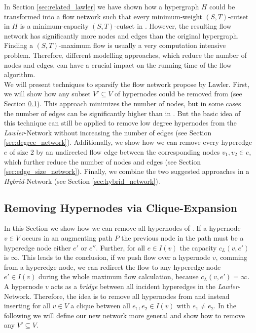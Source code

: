
In Section \ref{sec:related_lawler} we have shown how a hypergraph $H$ could be transformed into 
a flow network  such that every minimum-weight $(S,T)$-cutset in $H$ is a
minimum-capacity $(S,T)$-cutset in  \cite{lawler1973}. However, the resulting flow
network has significantly more nodes and edges than the original hypergraph. Finding a
$(S,T)$-maximum flow is usually a very computation intensive problem. 
Therefore, different modelling approaches, which reduce the number of nodes and edges,
can have a crucial impact on the running time of the flow algorithm. \\
We will present techniques to sparsify the flow network 
propose by Lawler. First, we will show how any subset $V' \subseteq V$ of hypernodes could be removed 
from  (see Section \ref{sec:heuer_network}). This approach minimizes
the number of nodes, but in some cases the number of edges can be
significantly higher than in . But the basic idea of this technique 
can still be applied to remove low degree hypernodes from the \emph{Lawler}-Network without 
increasing the number of edges (see Section \ref{sec:degree_network}). Additionally, we show
how we can remove every hyperedge $e$ of size $2$ by an undirected flow edge between
the corresponding nodes $v_1,v_2 \in e$, which further reduce the
number of nodes and edges (see Section \ref{sec:edge_size_network}). Finally, we combine
the two suggested approaches in a \emph{Hybrid}-Network (see Section \ref{sec:hybrid_network}).



\subsection{Removing Hypernodes via Clique-Expansion}
\label{sec:heuer_network}

In this Section we show how we can remove all hypernodes of . If a hypernode $v \in V$
occurs in an augmenting path $P$ the previous node in the path must be a hyperedge node either
$e'$ or $e''$. Further, for all $e \in I(v)$ the capacity $c_L(v,e')$ is $\infty$. This leads to
the conclusion, if we push flow over a hypernode $v$, comming from a hyperedge node, we can redirect
the flow to any hyperedge node $e' \in I(v)$ during the whole maximum flow calculation, because 
$c_L(v,e') = \infty$. A hypernode $v$ acts as a \emph{bridge} between all incident hyperedges in the 
\emph{Lawler}-Network. Therefore, the idea is to remove all hypernodes from  and instead
inserting for all $v \in V$ a clique between all $e_1, e_2 \in I(v)$ with $e_1 \neq e_2$.
In the following we will define our new network more general and show how to remove
any $V' \subseteq V$.


